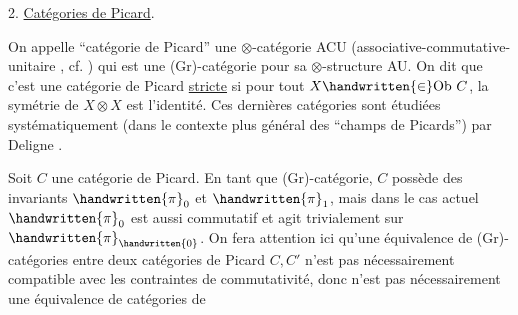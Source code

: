 2. \uline{Catégories de Picard}.

On appelle ``catégorie de Picard'' une $\otimes$-catégorie ACU (associative-commutative-unitaire , cf. \handwritten{[\, ]}) qui est une (Gr)-catégorie pour sa  $\otimes$-structure AU. On dit que c'est une catégorie de Picard \uline{stricte} si pour tout $X\handwritten{\in}\mathrm{Ob}\ C$, la symétrie de $X\otimes X$ est l'identité. Ces  dernières catégories sont étudiées systématiquement (dans le contexte plus général des ``champs de Picards'') par Deligne \handwritten{[\, ]}.

Soit $C$ une catégorie de Picard. En tant que (Gr)-catégorie, $C$ possède des invariants $\handwritten{\pi}_{0}$ et $\handwritten{\pi}_{1}$, mais dans le cas actuel $\handwritten{\pi}_{0}$ est aussi commutatif et agit trivialement sur $\handwritten{\pi}_{\handwritten{0}}$. On fera attention ici qu'une équivalence de (Gr)-catégories entre deux catégories de Picard $C,C'$ n'est pas nécessairement compatible avec les contraintes de commutativité, donc n'est pas nécessairement une équivalence de catégories de
